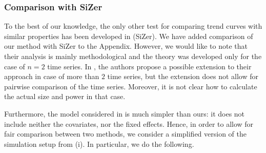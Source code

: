 \documentclass[a4paper,12pt]{article}
\begin{document}
\subsubsection*{Comparison with SiZer} 


 To the best of our knowledge, the only other test for comparing trend curves with similar properties has been developed in \cite{Park2009} (SiZer). We have added comparison of our method with SiZer to the Appendix. However, we would like to note that their analysis is mainly methodological and the theory was developed only for the case of $n=2$ time series. In \cite{Park2009}, the authors propose a possible extension to their approach in case of more than $2$ time series, but the extension does not allow for pairwise comparison of the time series. Moreover, it is not clear how to calculate the actual size and power in that case.

Furthermore, the model considered in \cite{Park2009} is much simpler than ours: it does not include neither the covariates, nor the fixed effects. Hence, in order to allow for fair comparison between two methods, we consider a simplified version of the simulation setup from (i). In particular, we do the following.
\end{document}
